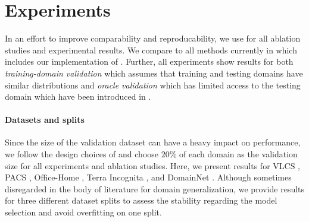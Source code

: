 \section{Experiments}
In an effort to improve comparability and reproducability, we use \domainbed \citep{gulrajani2020search} for all ablation studies and experimental results. We compare to all methods currently in \domainbed which includes our implementation of \rsc. Further, all experiments show results for both \emph{training-domain validation} which assumes that training and testing domains have similar distributions  and \emph{oracle validation} which has limited access to the testing domain which have been introduced in .

\paragraph{Datasets and splits}
Since the size of the validation dataset can have a heavy impact on performance, we follow the design choices of \domainbed and choose $20\%$ of each domain as the validation size for all experiments and ablation studies. Here, we present results for VLCS \citep{FangXR13}, PACS \citep{LiYSH17}, Office-Home \citep{VenkateswaraECP17}, Terra Incognita \citep{BeeryHP18}, and DomainNet \citep{PengBXHSW19}. Although sometimes disregarded in the body of literature for domain generalization, we provide results for three different dataset splits to assess the stability regarding the model selection and avoid overfitting on one split. 

